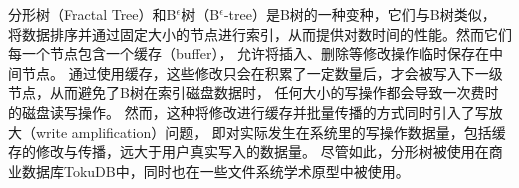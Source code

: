 分形树\cite{esmet2012tokufs}（Fractal Tree）和B$^\epsilon$树\cite{bender2015and}（B$^\epsilon$-tree）是B树的一种变种，它们与B树类似，
将数据排序并通过固定大小的节点进行索引，从而提供对数时间的性能。然而它们每一个节点包含一个缓存（buffer），
允许将插入、删除等修改操作临时保存在中间节点。
通过使用缓存，这些修改只会在积累了一定数量后，才会被写入下一级节点，从而避免了B树在索引磁盘数据时，
任何大小的写操作都会导致一次费时的磁盘读写操作。
然而，这种将修改进行缓存并批量传播的方式同时引入了写放大（write amplification）问题，
即对实际发生在系统里的写操作数据量，包括缓存的修改与传播，远大于用户真实写入的数据量。
尽管如此，分形树被使用在商业数据库TokuDB中，同时也在一些文件系统学术原型中\cite{jannen2015betrfs, yuan2016optimizing, zhan2018full}被使用。



